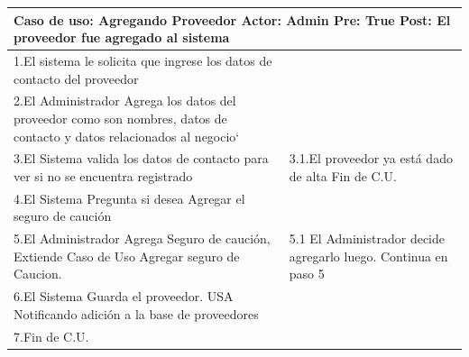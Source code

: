 \begin{longtable}{| p{} | p{} |} 
    \hline
    \multicolumn{2}{|p{16cm}|}{
        \textbf{Caso de uso:} Agregando Proveedor \newline
        \textbf{Actor:} Admin\newline
        \textbf{Pre:}  True\newline
        \textbf{Post:} El proveedor fue agregado al sistema
    }\\
    \hline
    1.El sistema le solicita que ingrese los datos de contacto del proveedor & \\
    \hline
    2.El Administrador Agrega los datos del proveedor como son nombres, datos de contacto y datos relacionados al negocio` &  \\
    \hline
    3.El Sistema valida los datos de contacto para ver si no se encuentra registrado & 3.1.El proveedor ya está dado de alta \newline 3.2 Fin de C.U.  \\
    \hline
    4.El Sistema Pregunta si desea Agregar el seguro de caución&\\
    \hline
    5.El Administrador Agrega Seguro de caución, Extiende Caso de Uso Agregar seguro de Caucion. & 5.1 El Administrador decide agregarlo luego. Continua en paso 5 \\
    \hline
    6.El Sistema Guarda el proveedor. USA Notificando adición a la base de proveedores& \\
    \hline
    7.Fin de C.U.& \\
    \hline
\end{longtable}

